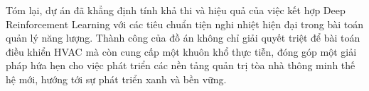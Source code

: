 Tóm lại, dự án đã khẳng định tính khả thi và hiệu quả của việc kết hợp Deep Reinforcement Learning với các tiêu chuẩn tiện nghi nhiệt hiện đại trong bài toán quản lý năng lượng. Thành công của đồ án không chỉ giải quyết triệt để bài toán điều khiển HVAC mà còn cung cấp một khuôn khổ thực tiễn, đóng góp một giải pháp hứa hẹn cho việc phát triển các nền tảng quản trị tòa nhà thông minh thế hệ mới, hướng tới sự phát triển xanh và bền vững.

\cleardoublepage